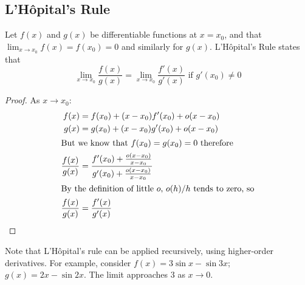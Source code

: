 \subsection{L'H\^opital's Rule}
Let $f(x)$ and $g(x)$ be differentiable functions at $x=x_0$, and that $\lim_{x\to x_0} f(x) = f(x_0) = 0$ and similarly for $g(x)$. L'H\^opital's Rule states that
\[ \lim_{x\to x_0} \frac{f(x)}{g(x)} = \lim_{x\to x_0} \frac{f'(x)}{g'(x)} \text{ if } g'(x_0) \neq 0 \]
\begin{proof}
	As $x \to x_0$:
	\begin{align*}
		f(x)              & = f(x_0) + (x-x_0) f'(x_0) + o(x-x_0)                                       \\
		g(x)              & = g(x_0) + (x-x_0) g'(x_0) + o(x-x_0)                                       \\
		\intertext{But we know that $f(x_0)=g(x_0)=0$ therefore}
		\frac{f(x)}{g(x)} & = \frac{f'(x_0) + \frac{o(x-x_0)}{x-x_0}}{g'(x_0) + \frac{o(x-x_0)}{x-x_0}} \\
		\intertext{By the definition of little $o$, $o(h)/h$ tends to zero, so}
		\frac{f(x)}{g(x)} & = \frac{f'(x)}{g'(x)}
	\end{align*}
\end{proof}
Note that L'H\^opital's rule can be applied recursively, using higher-order derivatives. For example, consider $f(x) = 3\sin x - \sin 3x$; $g(x) = 2x - \sin 2x$. The limit approaches 3 as $x \to 0$.
